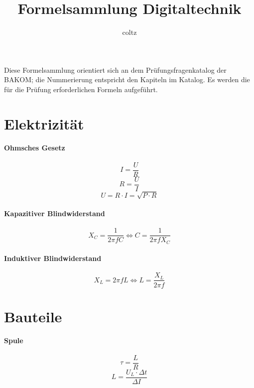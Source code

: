 \documentclass[10pt,landscape]{scrartcl}
\author{coltz}
\title{Formelsammlung Digitaltechnik}
\begin{document}
\setlength{\columnsep}{1cm}
\begin{multicols}{3}

\noindent
Diese Formelsammlung orientiert sich an dem Prüfungsfragenkatalog der BAKOM;
die Nummerierung entspricht den Kapiteln im Katalog.
Es werden die für die Prüfung erforderlichen Formeln aufgeführt.

\section{Elektrizität}
\paragraph{Ohmsches Gesetz}

$$ I = \frac{U}{R} $$
$$ R = \frac{U}{I} $$
$$ U= R \cdot I = \sqrt{P\cdot R} $$

\paragraph{Kapazitiver Blindwiderstand}

$$ X_C =  \frac{1}{2 \pi f C} \Longleftrightarrow C =  \frac{1}{2 \pi f X_C} $$

\paragraph{Induktiver Blindwiderstand}

$$ X_L =  2 \pi f L \Longleftrightarrow L =  \frac{X_L}{2 \pi f} $$

\section{Bauteile}

\paragraph{Spule}
$$ \tau = \frac{L}{R} $$
$$ L = \frac{U_L \cdot \Delta t}{\Delta I} $$

\noindent
{}


\end{multicols}
\end{document}
